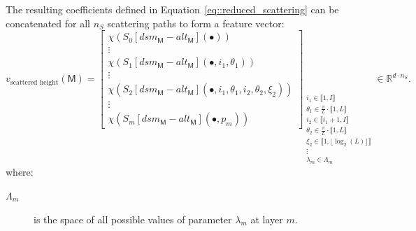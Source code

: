             The resulting coefficients defined in Equation~\ref{eq::reduced_scattering} can be concatenated for all \(n_S\) scattering paths to form a feature vector:
            \begin{equation}
                \label{eq::scatnet_height_based_features}
                v_{\text{scattered height}}\left(\mathsf{M}\right) = \begin{bmatrix}
                    \chi \left(S_0[dsm_{\mathsf{M}} - alt_{\mathsf{M}}]\left(\bullet\right)\right)\\
                    \vdots\\
                    \chi \left(S_1[dsm_{\mathsf{M}} - alt_{\mathsf{M}}]\left(\bullet, i_1, \theta_1\right)\right)\\
                    \vdots\\
                    \chi \left(S_2[dsm_{\mathsf{M}} - alt_{\mathsf{M}}]\left(\bullet, i_1, \theta_1, i_2, \theta_2, \xi_2\right)\right)\\
                    \vdots\\
                    \chi \left(S_m[dsm_{\mathsf{M}} - alt_{\mathsf{M}}]\left(\bullet, p_m\right)\right)
                \end{bmatrix}_{
                    \substack{
                        i_1 \in \llbracket 1, I \rrbracket\\
                        \theta_1 \in \frac{\pi}{L} \cdot \llbracket 1, L \rrbracket\\
                        i_2 \in \llbracket i_1 + 1, I \rrbracket\\
                        \theta_2 \in \frac{\pi}{L} \cdot \llbracket 1, L \rrbracket\\
                        \xi_2 \in \llbracket 1, \lfloor\log_2(L)\rfloor \rrbracket\\
                        \vdots\\
                        \lambda_m \in \Lambda_m
                    }
                } \in \mathbb{R}^{d \cdot n_S}.
            \end{equation}
            where:
            \begin{description}
                \item[\(\Lambda_m\)] is the space of all possible values of parameter \(\lambda_m\) at layer \(m\).
            \end{description}

